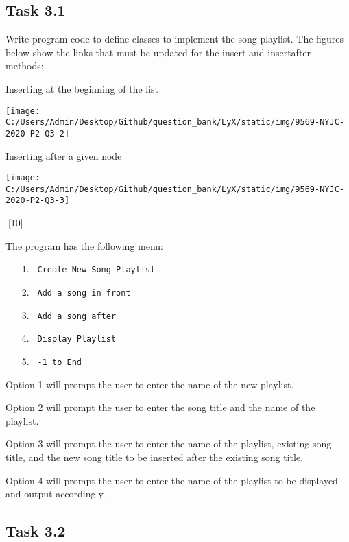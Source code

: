 \subsection*{Task 3.1 }

Write program code to define classes to implement the song playlist.
The figures below show the links that must be updated for the insert
and insertafter methods: 

Inserting at the beginning of the list
\begin{center}
\texttt{[image: C:/Users/Admin/Desktop/Github/question\_bank/LyX/static/img/9569-NYJC-2020-P2-Q3-2]}
\par\end{center}

Inserting after a given node
\begin{center}
\texttt{[image: C:/Users/Admin/Desktop/Github/question\_bank/LyX/static/img/9569-NYJC-2020-P2-Q3-3]}
\par\end{center}

\noindent \begin{center}
\textcolor{white}{.}\hfill{}{[}10{]} 
\par\end{center}

The program has the following menu: 
\begin{enumerate}
\item[1.] \texttt{ Create New Song Playlist }
\item[2.] \texttt{ Add a song in front }
\item[3.] \texttt{ Add a song after }
\item[4.] \texttt{ Display Playlist }
\item[5.] \texttt{ -1 to End }
\end{enumerate}
Option 1 will prompt the user to enter the name of the new playlist. 

Option 2 will prompt the user to enter the song title and the name
of the playlist. 

Option 3 will prompt the user to enter the name of the playlist, existing
song title, and the new song title to be inserted after the existing
song title. 

Option 4 will prompt the user to enter the name of the playlist to
be displayed and output accordingly. 

\subsection*{Task 3.2 }

